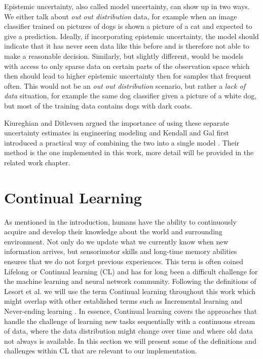 \documentclass[a4paper,12pt]{report}
\begin{document}
Epistemic uncertainty, also called model uncertainty, can show up in two ways. We either talk about \textit{out out distribution} data, for example when an image classifier trained on pictures of dogs is shown a picture of a cat and expected to give a prediction. Ideally, if incorporating epistemic uncertainty, the model should indicate that it has never seen data like this before and is therefore not able to make a reasonable decision. Similarly, but slightly different, would be models with access to only sparse data on certain parts of the observation space which then should lead to higher epistemic uncertainty then for samples that frequent often. This would not be an \textit{out out distribution} scenario, but rather a \textit{lack of data} situation, for example the  same dog classifier given a picture of a white dog, but most of the training data contains dogs with dark coats.

Kiureghian and Ditlevsen argued the importance of using these separate uncertainty estimates in engineering modeling \cite{der2009aleatory} and Kendall and Gal first introduced a practical way of combining the two into a single model \cite{kendall2017uncertainties}. Their method is the one implemented in this work, more detail will be provided in the related work chapter.

\section{Continual Learning}
As mentioned in the introduction, humans have the ability to continuously acquire and develop their knowledge about the world and surrounding environment. Not only do we update what we currently know when new information arrives, but sensorimotor skills and long-time memory abilities ensures that we do not forget previous experiences. This term is often coined Lifelong \cite{thrun1995lifelong, chen2016lifelong} or Continual learning (CL)   \cite{ring1994continual} and has for long been a difficult challenge for the machine learning and neural network community. Following the definitions of Lesort et al. \cite{lesort2020continual} we will use the term Continual learning throughout this work which might overlap with other established terms such as Incremental learning \cite{gepperth2016incremental} and Never-ending learning \cite{carlson2010toward}. In essence, Continual learning covers the approaches that handle the challenge of learning new tasks sequentially with a continuous stream of data, where the data distribution might change over time and where old data not always is available. In this section we will present some of the definitions and challenges within CL that are relevant to our implementation.
\end{document}
